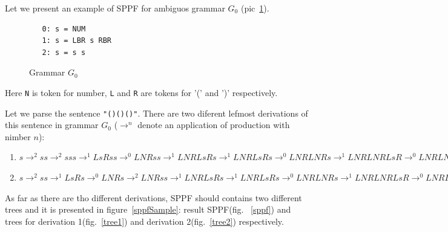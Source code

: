 \documentclass{sig-alternate} %
\begin{document}
Let we present an example of SPPF for ambiguos grammar $G_0$ (pic~\ref{grammarG0}).

\begin{figure}[h]
   \begin{center}
\begin{verbatim}
   0: s = NUM
   1: s = LBR s RBR
   2: s = s s
\end{verbatim}
   \caption{Grammar $G_0$}
   \label{grammarG0}        
   \end{center}
\end{figure}

Here \verb|N| is token for number, \verb|L| and \verb|R| are tokens for '(' and ')'  respectively.

Let we parse the sentence \verb|"()()()"|. 
There are two diferent lefmost derivations of this sentence in grammar $G_0$ ($\rightarrow ^ n$ denote an application of production with nimber $n$): 
\begin{enumerate} 
    \item $s \rightarrow ^ 2 s s \rightarrow ^ 2 s s s \rightarrow ^ 1 L s R s s \rightarrow ^ 0 L N R s s \rightarrow ^ 1 
    L N R L s R s \rightarrow ^ 1 L N R L s R s \rightarrow ^ 0 L N R L N R s \rightarrow ^ 1 L N R L N R L s R \rightarrow ^ 0 L N R L N R L N R$
    \item $s \rightarrow ^ 2 s s \rightarrow ^ 1 L s R s  \rightarrow ^ 0 L N R s \rightarrow ^ 2 L N R s s  \rightarrow ^ 1 
    L N R L s R s \rightarrow ^ 1 L N R L s R s \rightarrow ^ 0 L N R L N R s \rightarrow ^ 1 L N R L N R L s R \rightarrow ^ 0 L N R L N R L N R$
\end{enumerate}
 
    As far as there are tho different derivations, SPPF should contains two different trees and it is presented in figure~\ref{sppfSample}: result SPPF(fig. ~\ref{sppf}) and trees for derivation 1(fig.~\ref{tree1}) and derivation 2(fig.~\ref{tree2}) respectively. 
 
\end{document}

